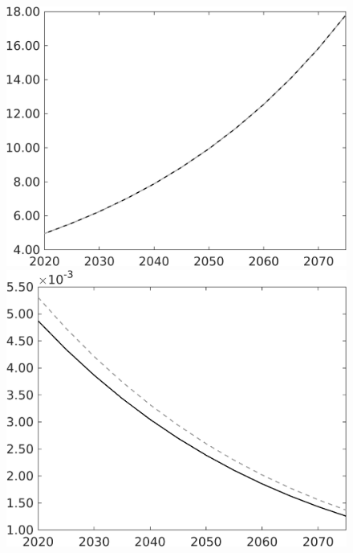 \documentclass[12pt]{article}
\begin{document}
\begin{figure}[h!!]
\begin{minipage}[]{0.32\textwidth}
	\end{minipage}	
	\begin{minipage}[]{0.32\textwidth}
		\includegraphics[width=1\textwidth]{../../codding_model/own_basedOnFried/optimalPol_010922_revision/figures/all_13Sept22/CompTaul_LFBAU_Reg0_pgpftf_spillover0_nsk1_xgr1_knspil1_sep1_countec0_GovRev0_etaa0.79_lgd0.png}
	\end{minipage}	
	\begin{minipage}[]{0.32\textwidth}
		\includegraphics[width=1\textwidth]{../../codding_model/own_basedOnFried/optimalPol_010922_revision/figures/all_13Sept22/CompTaul_LFBAU_Reg0_Lf_spillover0_nsk1_xgr1_knspil1_sep1_countec0_GovRev0_etaa0.79_lgd0.png}

\end{minipage}
\end{figure}
\end{document}
